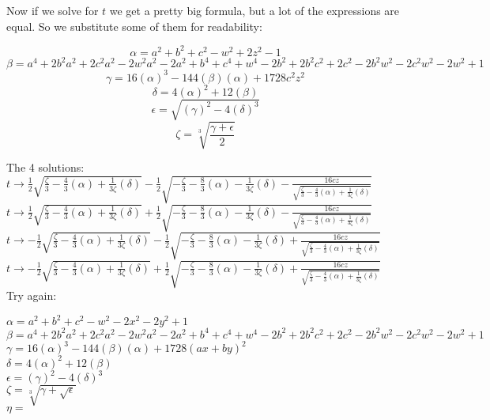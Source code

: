\documentclass[12pt,a4paper,landscape]{amsart}
\numberwithin{equation}{section}
\theoremstyle{plain}
\theoremstyle{definition}
\begin{document}
\newpage
Now if we solve for $t$ we get a pretty big formula, but a lot of the expressions are equal. So we substitute some of them for readability:

\[\alpha = a^2+b^2+c^2-w^2+2 z^2-1\]
\[\beta = a^4+2 b^2 a^2+2 c^2 a^2-2 w^2 a^2-2 a^2+b^4+c^4+w^4-2 b^2+2 b^2 c^2+2 c^2-2 b^2 w^2-2 c^2 w^2-2 w^2+1\]
\[\gamma = 16 \left(\alpha\right)^3-144 \left(\beta\right) \left(\alpha\right)+1728 c^2 z^2\]
\[\delta = 4 \left(\alpha\right)^2+12 \left(\beta\right)\]
\[\epsilon = \sqrt{\left(\gamma\right)^2-4 \left(\delta\right)^3} \]
\[\zeta = \sqrt[3]{\frac{\gamma+\epsilon}{2}} \]

The 4 solutions:\\

$
t\to \frac{1}{2} \sqrt{\frac{\zeta}{3}-\frac{4}{3} \left(\alpha\right)+\frac{1}{3\zeta}\left(\delta\right)}-\frac{1}{2} \sqrt{-\frac{\zeta}{3}-\frac{8}{3} \left(\alpha\right)-\frac{1}{3\zeta}\left(\delta\right)-\frac{16 c z}{\sqrt{\frac{\zeta}{3}-\frac{4}{3} \left(\alpha\right)+\frac{1}{3 \zeta}\left(\delta\right)}}}
$\\

$
t\to \frac{1}{2} \sqrt{\frac{\zeta}{3}-\frac{4}{3} \left(\alpha\right)+\frac{1}{3\zeta}\left(\delta\right)}+\frac{1}{2} \sqrt{-\frac{\zeta}{3}-\frac{8}{3} \left(\alpha\right)-\frac{1}{3\zeta}\left(\delta\right)-\frac{16 c z}{\sqrt{\frac{\zeta}{3}-\frac{4}{3} \left(\alpha\right)+\frac{1}{3 \zeta}\left(\delta\right)}}}
$\\

$
t\to -\frac{1}{2} \sqrt{\frac{\zeta}{3}-\frac{4}{3} \left(\alpha\right)+\frac{1}{3\zeta}\left(\delta\right)}-\frac{1}{2} \sqrt{-\frac{\zeta}{3}-\frac{8}{3} \left(\alpha\right)-\frac{1}{3\zeta}\left(\delta\right)+\frac{16 c z}{\sqrt{\frac{\zeta}{3}-\frac{4}{3} \left(\alpha\right)+\frac{1}{3 \zeta}\left(\delta\right)}}}
$\\

$
t\to -\frac{1}{2} \sqrt{\frac{\zeta}{3}-\frac{4}{3} \left(\alpha\right)+\frac{1}{3\zeta}\left(\delta\right)}+\frac{1}{2} \sqrt{-\frac{\zeta}{3}-\frac{8}{3} \left(\alpha\right)-\frac{1}{3\zeta}\left(\delta\right)+\frac{16 c z}{\sqrt{\frac{\zeta}{3}-\frac{4}{3} \left(\alpha\right)+\frac{1}{3 \zeta}\left(\delta\right)}}}
$\\

\newpage
Try again:

$\alpha = a^2+b^2+c^2-w^2-2 x^2-2 y^2+1$\\
$\beta = a^4+2 b^2 a^2+2 c^2 a^2-2 w^2 a^2-2 a^2+b^4+c^4+w^4-2 b^2+2 b^2 c^2+2 c^2-2 b^2 w^2-2 c^2 w^2-2 w^2+1$\\
$\gamma = 16 \left(\alpha\right)^3-144 \left(\beta\right) \left(\alpha\right)+1728 (a x+b y)^2$\\
$\delta = 4 \left(\alpha\right)^2+12 \left(\beta\right)$\\
$\epsilon =\left(\gamma\right)^2-4 \left(\delta\right)^3 $\\
$\zeta = \sqrt[3]{\gamma+\sqrt{\epsilon}}$\\
$\eta =$\\
\end{document}
